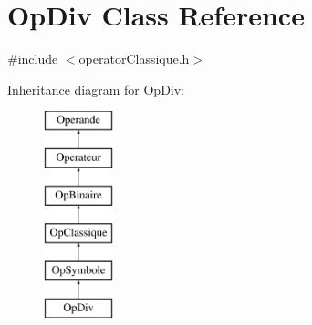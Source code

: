 \hypertarget{class_op_div}{}\section{Op\+Div Class Reference}
\label{class_op_div}


{\ttfamily \#include $<$operator\+Classique.\+h$>$}

Inheritance diagram for Op\+Div\+:\begin{figure}[H]
\begin{center}
\leavevmode
\includegraphics[height=6.000000cm]{class_op_div}
\end{center}
\end{figure}

